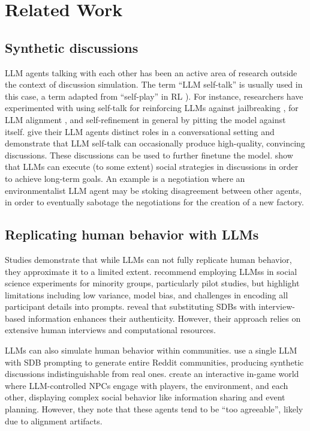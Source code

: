 %

\section{Related Work}


\subsection{Synthetic discussions}

\ac{LLM} agents talking with each other has been an active area of research outside the context of discussion simulation. The term “\ac{LLM} self-talk” is usually used in this case, a term adapted from “self-play” in \ac{RL} \citep{cheng2024selfplayingadversariallanguagegame}). For instance, researchers have experimented with using self-talk for reinforcing \acp{LLM} against jailbreaking \cite{liu2024largelanguagemodelsagents, cheng2024selfplayingadversariallanguagegame, zheng2024optimalllmalignmentsusing}, for \ac{LLM} alignment \cite{Bai2022ConstitutionalAH, collective_constitution}, and self-refinement in general \cite{Madaan2023SelfRefineIR, lambert2024} by pitting the model against itself. \citet{ulmer2024} give their \ac{LLM} agents distinct roles in a conversational setting and demonstrate that \ac{LLM} self-talk can occasionally produce high-quality, convincing discussions. These discussions can be used to further finetune the model.  \citet{abdelnabi_negotiations} show that \acp{LLM} can execute (to some extent) social strategies in discussions in order to achieve long-term goals. An example is a negotiation where an environmentalist \ac{LLM} agent may be stoking disagreement between other agents, in order to eventually sabotage the negotiations for the creation of a new factory.


\subsection{Replicating human behavior with LLMs}

Studies demonstrate that while \acp{LLM} can not fully replicate human behavior, they approximate it to a limited extent. \citet{hewitt2024predicting} recommend employing \acp{LLM}s in social science experiments for minority groups, particularly pilot studies, but highlight limitations including low variance, model bias, and challenges in encoding all participant details into prompts. \citet{park2024generativeagentsimulations1000} reveal that substituting \acp{SDB} with interview-based information enhances their authenticity. However, their approach relies on extensive human interviews and computational resources.

\acp{LLM} can also simulate human behavior within communities. \citet{park_simulacra} use a single \ac{LLM} with \ac{SDB} prompting to generate entire Reddit communities, producing synthetic discussions indistinguishable from real ones. \citet{Park2023GenerativeAI} create an interactive in-game world where \ac{LLM}-controlled \acp{NPC} engage with players, the environment, and each other, displaying complex social behavior like information sharing and event planning. However, they note that these agents tend to be “too agreeable”, likely due to alignment artifacts.
